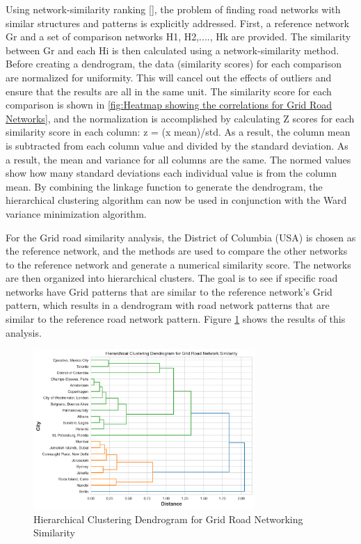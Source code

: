 Using network-similarity ranking [\cite{Soundarajan:2014}], the problem of finding road networks with similar structures and patterns is explicitly addressed. First, a reference network Gr and a set of comparison networks H1, H2,...., Hk are provided. The similarity between Gr and each Hi is then calculated using a network-similarity method. Before creating a dendrogram, the data (similarity scores) for each comparison are normalized for uniformity. This will cancel out the effects of outliers and ensure that the results are all in the same unit. The similarity score for each comparison is shown in \ref{fig:Heatmap showing the correlations for Grid Road Networks}, and the normalization is accomplished by calculating Z scores for each similarity score in each column: z = (x mean)/std. As a result, the column mean is subtracted from each column value and divided by the standard deviation. As a result, the mean and variance for all columns are the same. The normed values show how many standard deviations each individual value is from the column mean. By combining the linkage function to generate the dendrogram, the hierarchical clustering algorithm can now be used in conjunction with the Ward variance minimization algorithm.

For the Grid road similarity analysis, the District of Columbia (USA) is chosen as the reference network, and the methods are used to compare the other networks to the reference network and generate a numerical similarity score. The networks are then organized into hierarchical clusters. The goal is to see if specific road networks have Grid patterns that are similar to the reference network's Grid pattern, which results in a dendrogram with road network patterns that are similar to the reference road network pattern. Figure \ref{fig:Hierarchical Clustering Dendrogram for Grid Road Networking Similarity} shows the results of this analysis.

\begin{figure}[!ht]
\centering
\includegraphics[width=0.75\textwidth,center]{picture/Grid/grid_dendrogram2.png}
\caption[Hierarchical Clustering Dendrogram for Grid Road Networking Similarity]{Hierarchical Clustering Dendrogram for Grid Road Networking Similarity}
\label{fig:Hierarchical Clustering Dendrogram for Grid Road Networking Similarity}
\end{figure}

